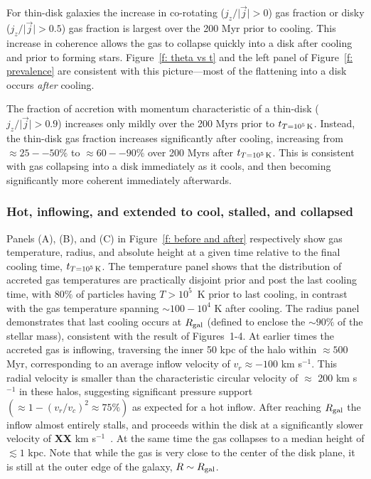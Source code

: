\documentclass[fleqn,usenatbib]{mnras}
\newcommand{\tcon}{t_{T=10^5\,{\rm K}}}
\begin{document}
For thin-disk galaxies the increase in co-rotating ($j_z/\vert \vec j \vert > 0$) gas fraction or disky ($j_z/\vert \vec j \vert > 0.5$) gas fraction is largest over the 200 Myr prior to cooling.
This increase in coherence allows the gas to collapse quickly into a disk after cooling and prior to forming stars.
Figure~\ref{f: theta vs t} and the left panel of Figure~\ref{f: prevalence} are consistent with this picture---most of the flattening into a disk occurs \textit{after} cooling.

The fraction of accretion with momentum characteristic of a thin-disk ($j_z / \vert \vec j \vert > 0.9$) increases only mildly over the 200 Myrs prior to $\tcon$.
Instead, the thin-disk gas fraction increases significantly after cooling, increasing from $\approx 25--50\%$ to $\approx 60--90\%$ over 200 Myrs after $\tcon$.
This is consistent with gas collapsing into a disk immediately as it cools, and then becoming significantly more coherent immediately afterwards.

\subsubsection{Hot, inflowing, and extended to cool, stalled, and collapsed}
\label{s: mechanics -- temp and radius}


Panels (A), (B), and (C) in Figure~\ref{f: before and after} respectively show gas temperature, radius, and absolute height at a given time relative to the final cooling time, $\tcon$.
The temperature panel shows that the distribution of accreted gas temperatures are practically disjoint prior and post the last cooling time, with $80\%$ of particles having $T > 10^5$~K prior to last cooling, in contrast with the gas temperature spanning $\sim100- 10^4$ K after cooling. 
The radius panel demonstrates that last cooling occurs at $R_{\rm gal}$ (defined to enclose the $\sim90\%$ of the stellar mass), consistent with the result of  Figures~1-4.
At earlier times the accreted gas is inflowing, traversing the inner 50 kpc of the halo within $\approx500$ Myr, corresponding to an average inflow velocity of $v_r\approx-100$ km s$^{-1}$.
This radial velocity is smaller than the characteristic circular velocity of $\approx$ 200 km s$^{-1}$ in these halos, suggesting significant pressure support $(\approx1-(v_r/v_c)^2\approx75\%)$ as expected for a hot inflow.
After reaching $R_{\rm gal}$ the inflow almost entirely stalls, and proceeds within the disk at a significantly slower velocity of \textbf{XX} km s$^{-1}$~\citep{Trapp2021}.
At the same time the gas collapses to a median height of $\lesssim 1$ kpc.
Note that while the gas is very close to the center of the disk plane, it is still at the outer edge of the galaxy, $R \sim R_{\rm gal}$.
\end{document}
